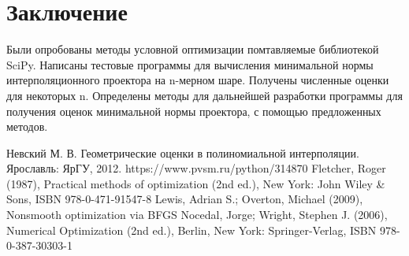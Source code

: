 \documentclass[12pt]{article} %
\begin{document}
\section{Заключение} 
Были опробованы методы условной оптимизации помтавляемые библиотекой SciPy. Написаны тестовые программы для вычисления минимальной нормы интерполяционного проектора на n-мерном шаре. Получены численные оценки для некоторых n. Определены методы для дальнейшей разработки программы для получения оценок минимальной нормы проектора, с помощью предложенных методов.
\newpage
\begin{thebibliography}{1}
	Невский М. В. Геометрические оценки в полиномиальной интерполяции. Ярославль: ЯрГУ, 2012.
	https://www.pvsm.ru/python/314870
	Fletcher, Roger (1987), Practical methods of optimization (2nd ed.), New York: John Wiley \& Sons, ISBN 978-0-471-91547-8
	Lewis, Adrian S.; Overton, Michael (2009), Nonsmooth optimization via BFGS
	Nocedal, Jorge; Wright, Stephen J. (2006), Numerical Optimization (2nd ed.), Berlin, New York: Springer-Verlag, ISBN 978-0-387-30303-1
	
	
\end{thebibliography}
\newpage
\end{document}
